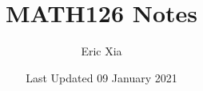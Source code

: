 \documentclass{article}
\title{MATH126 Notes}
\author{Eric Xia}
\date{Last Updated 09 January 2021}
\begin{document}
    \maketitle
    \tableofcontents
    \pagebreak


    
    
    
    
    
\end{document}
